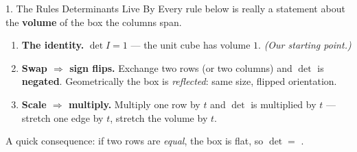 \documentclass[10pt]{article}
\begin{document}
\begin{notesbox}{1. The Rules Determinants Live By}
Every rule below is really a statement about the \textbf{volume} of the box the columns span.
\begin{enumerate}[leftmargin=1.5em, itemsep=3pt]
  \item \textbf{The identity.} $\det I=1$ --- the unit cube has volume $1$. \emph{(Our starting point.)}
  \item \textbf{Swap $\Rightarrow$ sign flips.} Exchange two rows (or two columns) and $\det$ is
        \textbf{negated}. Geometrically the box is \emph{reflected}: same size, flipped orientation.
  \item \textbf{Scale $\Rightarrow$ multiply.} Multiply one row by $t$ and $\det$ is multiplied by $t$
        --- stretch one edge by $t$, stretch the volume by $t$.
\end{enumerate}
A quick consequence: if two rows are \emph{equal}, the box is flat, so $\det=$ \blank{1.4cm}.
\end{notesbox}
\end{document}
